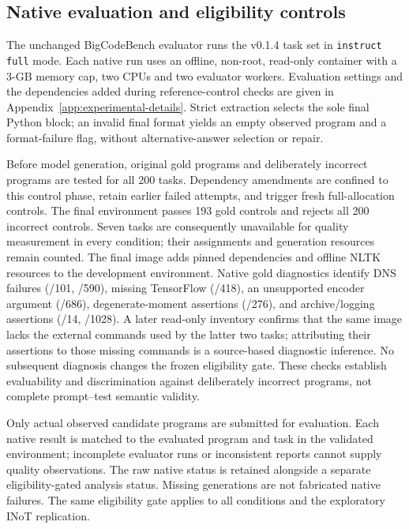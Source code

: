 \subsection{Native evaluation and eligibility controls}
The unchanged BigCodeBench evaluator runs the v0.1.4 task set in \texttt{instruct full} mode. Each native run uses an offline, non-root, read-only container with a 3-GB memory cap, two CPUs and two evaluator workers. Evaluation settings and the dependencies added during reference-control checks are given in Appendix~\ref{app:experimental-details}. Strict extraction selects the sole final Python block; an invalid final format yields an empty observed program and a format-failure flag, without alternative-answer selection or repair.

Before model generation, original gold programs and deliberately incorrect programs are tested for all 200 tasks. Dependency amendments are confined to this control phase, retain earlier failed attempts, and trigger fresh full-allocation controls. The final environment passes 193 gold controls and rejects all 200 incorrect controls. Seven tasks are consequently unavailable for quality measurement in every condition; their assignments and generation resources remain counted. The final image adds pinned dependencies and offline NLTK resources to the development environment. Native gold diagnostics identify DNS failures (/101, /590), missing TensorFlow (/418), an unsupported encoder argument (/686), degenerate-moment assertions (/276), and archive/logging assertions (/14, /1028). A later read-only inventory confirms that the same image lacks the external commands used by the latter two tasks; attributing their assertions to those missing commands is a source-based diagnostic inference. No subsequent diagnosis changes the frozen eligibility gate. These checks establish evaluability and discrimination against deliberately incorrect programs, not complete prompt--test semantic validity.

Only actual observed candidate programs are submitted for evaluation. Each native result is matched to the evaluated program and task in the validated environment; incomplete evaluator runs or inconsistent reports cannot supply quality observations. The raw native status is retained alongside a separate eligibility-gated analysis status. Missing generations are not fabricated native failures. The same eligibility gate applies to all conditions and the exploratory INoT replication.

